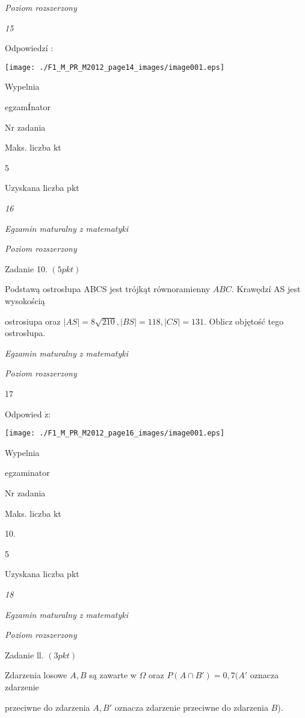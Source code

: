 \documentclass[a4paper,12pt]{article}
\begin{document}
{\it Poziom rozszerzony}

{\it 15}

Odpowiedzí :
\begin{center}
\texttt{[image: ./F1\_M\_PR\_M2012\_page14\_images/image001.eps]}
\end{center}
Wypelnia

egzamÍnator

Nr zadania

Maks. liczba kt

5

Uzyskana liczba pkt





{\it 16}

{\it Egzamin maturalny z matematyki}

{\it Poziom rozszerzony}

Zadanie 10. $(5pkt)$

Podstawą ostrosłupa ABCS jest trójkąt równoramienny $ABC$. Krawędzí AS jest wysokością

ostrosiupa oraz $|AS|=8\sqrt{210}, |BS|=118, |CS|=131$. Oblicz objętość tego ostrosłupa.





{\it Egzamin maturalny z matematyki}

{\it Poziom rozszerzony}

17

Odpowied $\acute{\mathrm{z}}$:
\begin{center}
\texttt{[image: ./F1\_M\_PR\_M2012\_page16\_images/image001.eps]}
\end{center}
Wypelnia

egzaminator

Nr zadania

Maks. liczba kt

10.

5

Uzyskana liczba pkt





{\it 18}

{\it Egzamin maturalny z matematyki}

{\it Poziom rozszerzony}

Zadanie ll. $(3pkt)$

Zdarzenia losowe $A, B$ są zawarte w $\Omega$ oraz $P(A\cap B')=0,7 (A'$ oznacza zdarzenie

przeciwne do zdarzenia $A, B'$ oznacza zdarzenie przeciwne do zdarzenia $B$).
\end{document}
